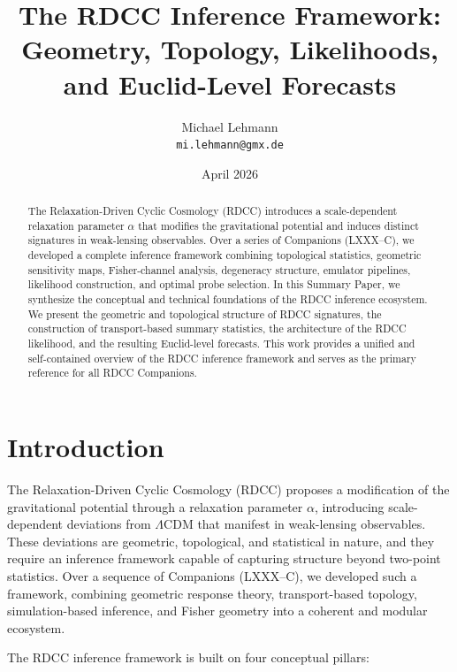 \documentclass[11pt,a4paper]{article}
\title{\textbf{The RDCC Inference Framework: Geometry, Topology, Likelihoods, and Euclid-Level Forecasts}}
\author{Michael Lehmann \\ \texttt{mi.lehmann@gmx.de}}
\date{April 2026}
\begin{document}
\maketitle

\begin{abstract}
The Relaxation-Driven Cyclic Cosmology (RDCC) introduces a scale-dependent 
relaxation parameter $\alpha$ that modifies the gravitational potential and 
induces distinct signatures in weak-lensing observables. Over a series of 
Companions (LXXX--C), we developed a complete inference framework combining 
topological statistics, geometric sensitivity maps, Fisher-channel analysis, 
degeneracy structure, emulator pipelines, likelihood construction, and optimal 
probe selection. In this Summary Paper, we synthesize the conceptual and 
technical foundations of the RDCC inference ecosystem. We present the geometric 
and topological structure of RDCC signatures, the construction of 
transport-based summary statistics, the architecture of the RDCC likelihood, 
and the resulting Euclid-level forecasts. This work provides a unified and 
self-contained overview of the RDCC inference framework and serves as the 
primary reference for all RDCC Companions.
\end{abstract}
\section{Introduction}

The Relaxation-Driven Cyclic Cosmology (RDCC) proposes a modification of the 
gravitational potential through a relaxation parameter $\alpha$, introducing 
scale-dependent deviations from $\Lambda$CDM that manifest in weak-lensing 
observables. These deviations are geometric, topological, and statistical in 
nature, and they require an inference framework capable of capturing structure 
beyond two-point statistics. Over a sequence of Companions (LXXX--C), we 
developed such a framework, combining geometric response theory, 
transport-based topology, simulation-based inference, and Fisher geometry into a 
coherent and modular ecosystem.

The RDCC inference framework is built on four conceptual pillars:
\end{document}
